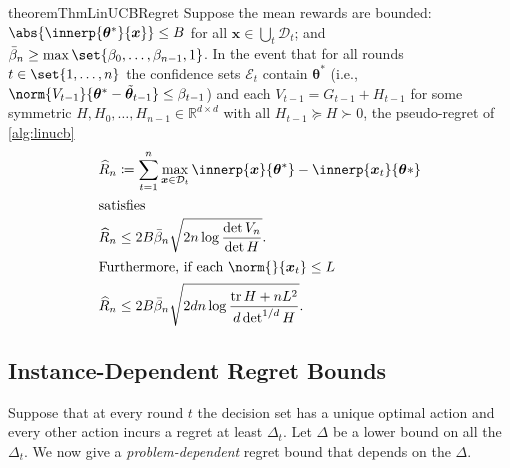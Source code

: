 \documentclass{article}
\renewcommand{\vec}[1]{\bm{#1}}
\newcommand{\defeq}{\coloneq}
\newcommand{\Real}{\mathds{R}}
\DeclareMathOperator{\tr}{tr}
\DeclarePairedDelimiter{\abs}||
\newcommand{\Dset}[1]{\mathcal{D}_{#1}}
\newcommand{\Eset}[1]{\mathcal{E}_{#1}}
\begin{document}
\begin{restatable}{theorem}{ThmLinUCBRegret}
  \label{thm:linucb-regret}%
  Suppose the mean rewards are bounded:
  $\abs{\innerp{\vec\theta^*}{\vec x}} \le B$ for all $\vec x \in \bigcup_t\Dset{t}$;
  and $\bar\beta_n \ge \max\set{\beta_0,\dotsc,\beta_{n-1},1}$.  In
  the event that for all rounds $t\in\set{1,\dotsc,n}$ the confidence
  sets $\Eset{t}$ contain $\vec\theta^*$ (i.e.,
  $\norm{V_{t-1}}{\vec\theta^* - \tilde{\vec\theta}_{t-1}} \le
  \beta_{t-1}$) and each $V_{t-1} = G_{t-1} + H_{t-1}$ for some
  symmetric $H,H_0,\dotsc,H_{n-1} \in \Real^{d\times d}$ with all
  $H_{t-1} \succeq H \succ 0$, the pseudo-regret of \cref{alg:linucb}
  \begin{align*}
    \widehat R_n
    &\defeq \sum_{t=1}^n \max_{\vec x\in\Dset{t}} \innerp{\vec x}{\vec\theta^*}
      - \innerp{\vec x_t}{\vec\theta*} \\
    \shortintertext{satisfies}
    \widehat R_n
    &\le 2B\bar\beta_n \sqrt{2n \log\frac{\det V_n}{\det H}}. \\
    \shortintertext{Furthermore, if each $\norm{}{\vec x_t} \le L$}
    \widehat R_n
    &\le 2B\bar\beta_n \sqrt{2dn \log\frac{\tr H + nL^2}{d\det^{1/d} H}}.
  \end{align*}
\end{restatable}

\subsection{Instance-Dependent Regret Bounds}%
\label{sec:prob-dep-regret}


\begin{theorem}
  Suppose that at every round $t$ the decision set has a unique optimal
  action and every other action incurs a regret at least $\Delta_t$.
  Let $\Delta$ be a lower bound on all the $\Delta_t$.  We now give a
  \emph{problem-dependent} regret bound that depends on the $\Delta$.
\end{theorem}
\end{document}

